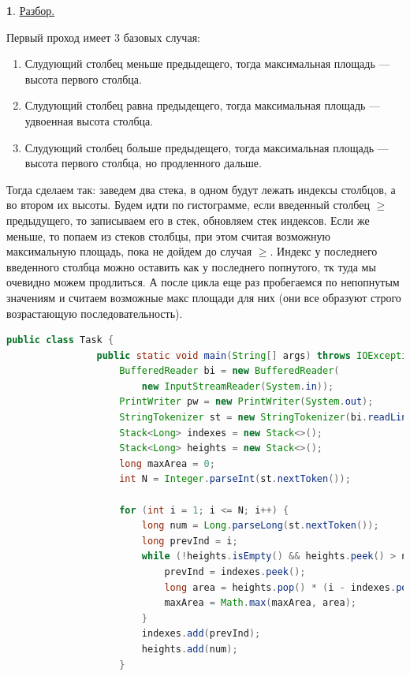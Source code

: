 \documentclass[14pt, a4paper]{extarticle}
\theoremstyle{definition}
\newtheorem{problem}{}
\theoremstyle{definition}
\theoremstyle{remark}
\numberwithin{equation}{section}
\begin{document}
\begin{problem}
    \href{https://youtu.be/zx5Sw9130L0}{Разбор.}

    Первый проход имеет 3 базовых случая:
    \renewcommand{\labelenumi}{\alph{enumi})}
    \begin{enumerate}
        \item Слудующий столбец меньше предыдещего,
        тогда максимальная площадь --- высота первого столбца.
        \item Слудующий столбец равна предыдещего, тогда
        максимальная площадь --- удвоенная высота столбца.
        \item Слудующий столбец больше предыдещего, тогда
        максимальная площадь --- высота первого столбца, но
        продленного дальше.
    \end{enumerate}

    Тогда сделаем так: заведем два стека, в одном будут лежать индексы
    столбцов, а во втором их высоты. Будем идти по гистограмме, если 
    введенный столбец $\geqslant$ предыдущего, то записываем его в стек,
    обновляем стек индексов. Если же меньше, то попаем из стеков столбцы,
    при этом считая возможную максимальную площадь, пока не дойдем до 
    случая $\geqslant$. Индекс у последнего введенного столбца можно 
    оставить как у последнего попнутого, тк туда мы очевидно можем 
    продлиться. А после цикла еще раз пробегаемся по непопнутым значениям
    и считаем возможные макс площади для них (они все образуют строго
    возрастающую последовательность).\\

    \begin{footnotesize}
        \begin{lstlisting}[language=Java]
            public class Task {
                public static void main(String[] args) throws IOException {
                    BufferedReader bi = new BufferedReader(
                        new InputStreamReader(System.in));
                    PrintWriter pw = new PrintWriter(System.out);
                    StringTokenizer st = new StringTokenizer(bi.readLine());
                    Stack<Long> indexes = new Stack<>();
                    Stack<Long> heights = new Stack<>();
                    long maxArea = 0;
                    int N = Integer.parseInt(st.nextToken());

                    for (int i = 1; i <= N; i++) {
                        long num = Long.parseLong(st.nextToken());
                        long prevInd = i;
                        while (!heights.isEmpty() && heights.peek() > num) {
                            prevInd = indexes.peek();
                            long area = heights.pop() * (i - indexes.pop());
                            maxArea = Math.max(maxArea, area);
                        }
                        indexes.add(prevInd);
                        heights.add(num);
                    }


\end{lstlisting}
\end{footnotesize}
\end{problem}
\end{document}
